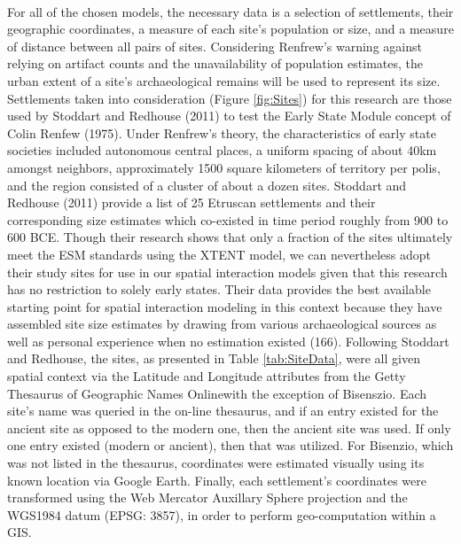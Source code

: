 \documentclass[12pt,a4paper]{thesis}
\begin{document}
\paragraph{}
For all of the chosen models, the necessary data is a selection of settlements, their geographic coordinates, a measure of each site's population or size, and a measure of distance between all pairs of sites. Considering Renfrew's warning against relying on artifact counts and the unavailability of population estimates, the urban extent of a site's archaeological remains will be used to represent its size. Settlements taken into consideration (Figure \ref{fig:Sites}) for this research are those used by Stoddart and Redhouse (2011) to test the Early State Module concept of Colin Renfew (1975). Under Renfrew's theory, the characteristics of early state societies included autonomous central places,  a uniform spacing of about 40km amongst neighbors, approximately 1500 square kilometers of territory per polis, and the region consisted of a cluster of about a dozen sites. Stoddart and Redhouse (2011) provide a list of 25 Etruscan settlements and their corresponding size estimates which co-existed in time period roughly from 900 to 600 BCE. Though their research shows that only a fraction of the sites ultimately meet the ESM standards using the XTENT model, we can nevertheless adopt their study sites for use in our spatial interaction models given that this research has no restriction to solely early states. Their data provides the best available starting point for spatial interaction modeling in this context because they have assembled site size estimates by drawing from various archaeological sources as well as personal experience when no estimation existed (166). Following Stoddart and Redhouse, the sites, as presented in Table \ref{tab:SiteData}, were all given spatial context via the Latitude and Longitude attributes from the Getty Thesaurus of Geographic Names Online\footnotemark with the exception of Bisenszio. Each site's name was queried in the on-line thesaurus, and if an entry existed for the ancient site as opposed to the modern one, then the ancient site was used. If only one entry existed (modern or ancient), then that was utilized. For Bisenzio, which was not listed in the thesaurus, coordinates were estimated visually using its known location via Google Earth. Finally, each settlement's coordinates were transformed using the Web Mercator Auxillary Sphere projection and the WGS1984 datum (EPSG: 3857), in order to perform geo-computation within a GIS.
\end{document}
